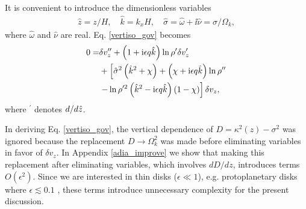 It is convenient to introduce the dimensionless variables
\begin{align}
  \hat{z} = z/H,\quad \hat{k}=k_xH, \quad \hat{\sigma} =\hat{\omega} +
  \ii\hat{\nu}= \sigma/\Omega_k,
\end{align}
where $\hat{\omega}$ and $\hat{\nu}$ are real. 
Eq. \ref{vertiso_gov} becomes 
\begin{align}
  0=& \delta v_z ^{\prime\prime} + \left(1 + \mathrm{i}\epsilon
    q\hat{k}\right)\ln\rho^{\prime}\delta v_z^\prime \notag\\
  &+
  \left[\hat{\sigma}^2\left(\hat{k}^2+\chi\right) +
    \left(  \chi + \mathrm{i} \epsilon q\hat{k}\right)\ln\rho^{\prime\prime}\right.
  \notag\\
  &\left.- \ln\rho^{\prime
      2}\left(\hat{k}^2 -
      \mathrm{i}\epsilon
      q\hat{k}\right)\left(1 - \chi\right)\right]\delta v_z,\label{vertiso_gov_nondim}
\end{align}
where $^\prime$ denotes $d/d\hat{z}$.

In deriving Eq. \ref{vertiso_gov}, the vertical dependence of
$D=\kappa^2(z)-\sigma^2$ was ignored because the replacement
$D\to\Omega_k^2$ was made before eliminating variables in favor of
$\delta v_z$. In Appendix \ref{adia_improve} we show that making this
replacement after eliminating variables, which involves $dD/dz$,
introduces terms $O(\epsilon^2)$. Since we are interested in 
thin disks ($\epsilon\ll 1 $), e.g. protoplanetary disks where 
$\epsilon\lesssim 0.1$ \citep{chiang10}, these terms introduce
unnecessary complexity for the present discussion. 
      